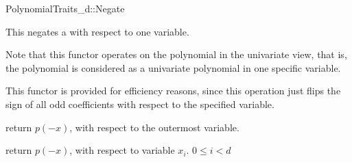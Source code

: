 \begin{ccRefConcept}{PolynomialTraits_d::Negate}
\ccDefinition

This  negates a  with  
respect to one variable. 

Note that this functor operates on the polynomial in the univariate view, that is, 
the polynomial is considered as a univariate polynomial in one specific variable. 

This functor is provided for efficiency reasons, since this operation just flips the sign 
of all odd coefficients with respect to the specified variable.  

\ccRefines 
{}

\ccTypes
{}
\ccGlue
{}

\ccOperations
{}
         { return $p(-x)$, with respect to the outermost variable. }

         { return $p(-x)$, with respect to variable $x_i$. 
           \ccPrecond $0 \leq i  < d$
         }


\ccSeeAlso

\\
\\

\end{ccRefConcept}
